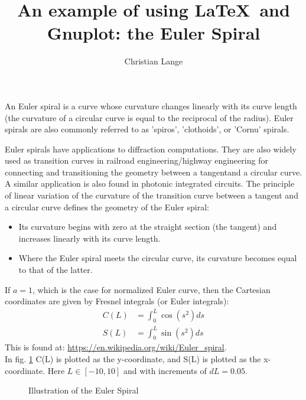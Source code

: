 \documentclass{article}
\title{An example of using \LaTeX \ and Gnuplot: the Euler Spiral}
\author{Christian Lange}
\begin{document}
\maketitle

An Euler spiral is a curve whose curvature changes linearly with its curve length 
(the curvature of a circular curve is equal to the reciprocal of the radius).
Euler spirals are also commonly referred to as 'spiros', 'clothoids', or 'Cornu' spirals.

Euler spirals have applications to diffraction computations. They are also widely used as transition curves in
railroad engineering/highway engineering for connecting and transitioning the geometry between a tangentand a circular curve.
A similar application is also found in photonic integrated circuits.
The principle of linear variation of the curvature of the transition curve between a tangent and 
a circular curve defines the geometry of the Euler spiral:\\


\begin{itemize}
 \item Its curvature begins with zero at the straight section (the tangent) and increases linearly with its curve length.
 \item Where the Euler spiral meets the circular curve, its curvature becomes equal to that of the latter.
\end{itemize}

If $a = 1$, which is the case for normalized Euler curve, then the Cartesian coordinates
are given by Fresnel integrals (or Euler integrals):
\begin{align}
C(L) &= \int_{0}^{L} \cos(s^2) ds\\
S(L) &= \int_{0}^{L} \sin(s^2) ds 
\end{align}
This is found at: \url{https://en.wikipedia.org/wiki/Euler_spiral}.\\

In fig. \ref{fig:eulerSpiral} C(L) is plotted as the y-coordinate, and S(L) is plotted as the x-coordinate. 
Here $L\in [-10,10]$ and with increments of $dL = 0.05$. 




\begin{figure}
\caption{Illustration of the Euler Spiral}

\label{fig:eulerSpiral}
\end{figure}
\end{document}
